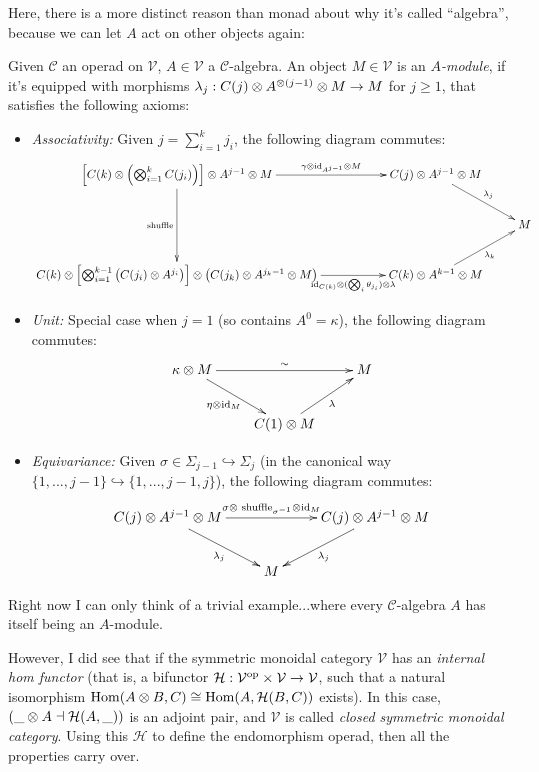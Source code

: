 \documentclass{article}
\begin{document}
Here, there is a more distinct reason than monad about why it's called ``algebra'', because we can let $A$ act on other objects again:
\begin{defn}
    Given $\mathcal{C}$ an operad on $\mathcal{V}$, $A\in\mathcal{V}$ a $\mathcal{C}$-algebra. An object $M\in\mathcal{V}$ is an \emph{$A$-module}, if it's equipped with morphisms $\lambda_j:C(j)\otimes A^{\otimes (j-1)}\otimes M\rightarrow M$ for $j\geq 1$, that satisfies the following axioms:
    \begin{itemize}
        \item \emph{Associativity:} Given $j=\sum_{i=1}^k j_i$, the following diagram commutes:
        \[\xymatrix{
            \left[C(k)\tensor \left(\bigtensor_{i=1}^k C(j_i)\right)\right]\tensor A^{j-1}\tensor M \ar[dd]_-{\text{shuffle}} \ar[rr]^-{\gamma\tensor \id_{A^{j-1}}\tensor M} && C(j) \tensor A^{j-1}\tensor M \ar[dr]^-{\lambda_j}\\
            &&& M\\
            C(k)\tensor \left[\bigtensor_{i=1}^{k-1}\left(C(j_i)\tensor A^{j_i}\right)\right] \tensor \left(C(j_k)\tensor A^{j_k-1}\tensor M\right) \ar[rr]_-{\id_{C(k)}\tensor (\bigtensor_i \theta_{j_i}) \tensor \lambda} && C(k)\tensor A^{k-1} \tensor M \ar[ur]_-{\lambda_k}
        }\]

        \item \emph{Unit:} Special case when $j=1$ (so contains $A^0=\kappa$), the following diagram commutes:
        \[\xymatrix{
            \kappa \tensor M \ar[dr]_-{\eta\tensor \id_M}\ar[rr]^-{\sim} && M\\
            & C(1)\tensor M \ar[ur]_-{\lambda}
        }\]
        \item \emph{Equivariance:} Given $\sigma\in \Sigma_{j-1}\hookrightarrow \Sigma_j$ (in the canonical way $\{1,...,j-1\}\hookrightarrow \{1,...,j-1,j\}$), the following diagram commutes:
        \[\xymatrix{
            C(j) \tensor A^{j-1}\tensor M \ar[dr]_-{\lambda_j} \ar[rr]^-{\sigma\tensor \text{ shuffle}_{\sigma^{-1}}\tensor \id_M} && C(j)\tensor A^{j-1}\tensor M \ar[dl]^-{\lambda_j}\\
            & M
        }\]
    \end{itemize}
\end{defn}

Right now I can only think of a trivial example...where every $\mathcal{C}$-algebra $A$ has itself being an $A$-module. 

However, I did see that if the symmetric monoidal category $\mathcal{V}$ has an \emph{internal hom functor} (that is, a bifunctor $\mathcal{H}:\mathcal{V}^{\mathrm{op}}\times \mathcal{V}\rightarrow\mathcal{V}$, such that a natural isomorphism $\mathrm{Hom}(A\otimes B,C)\cong \mathrm{Hom}(A,\mathcal{H}(B,C))$ exists). In this case, $(\_\otimes A\dashv \mathcal{H}(A,\_))$ is an adjoint pair, and $\mathcal{V}$ is called \emph{closed symmetric monoidal category}. Using this $\mathcal{H}$ to define the endomorphism operad, then all the properties carry over.
\end{document}
